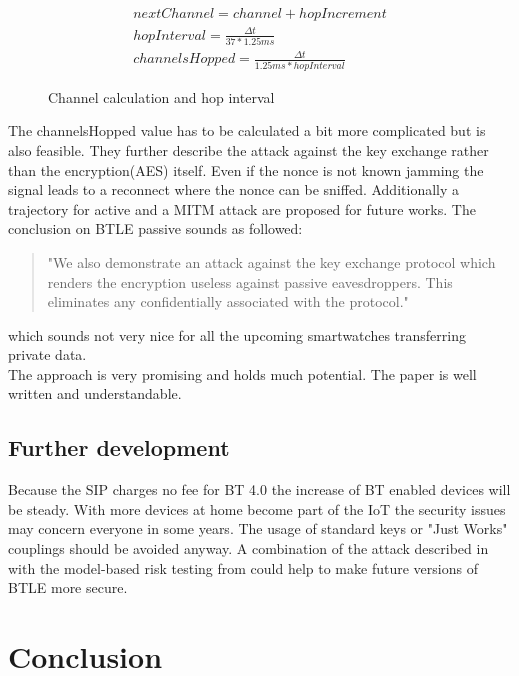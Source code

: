 \documentclass[12pt,a4paper]{article}
\begin{document}
\begin{figure}[h]
\begin{center}
	\begin{align*}
		nextChannel = channel + hopIncrement\\
 		hopInterval = \frac{\Delta t}{37 * 1.25ms} \\
 		channelsHopped = \frac{\Delta t}{1.25ms * hopInterval}
	\end{align*}
\caption{Channel calculation and hop interval \cite{DBLP:conf/woot/Ryan13}}
\label{le_bt_formulas}
\end{center}
\end{figure}
 The channelsHopped value has to be calculated a bit more complicated but is also feasible. They further describe the attack against the key exchange rather than the encryption(AES) itself. Even if the nonce is not known jamming the signal leads to a reconnect where the nonce can be sniffed. Additionally a trajectory for active and a MITM attack are proposed for future works.
The conclusion on BTLE passive sounds as followed:
\begin{quote}
	"We also demonstrate an attack against the key exchange protocol which renders the encryption useless against passive eavesdroppers. This eliminates any confidentially associated with the protocol."\cite{DBLP:conf/woot/Ryan13}
\end{quote}
which sounds not very nice for all the upcoming smartwatches transferring private data.\\
The approach is very promising and holds much potential. The paper is well written and understandable.

\subsection{Further development}
Because the SIP charges no fee for BT 4.0 the increase of BT enabled devices will be steady. With more devices at home become part of the IoT the security issues may concern everyone in some years. The usage of standard keys or "Just Works" couplings should be avoided anyway. A combination of the attack described in \cite{DBLP:conf/woot/Ryan13} with the model-based risk testing from \cite{DBLP:conf/automotiveSS/JakobKSGMSF12} could help to make future versions of BTLE more secure.

\section{Conclusion}
\end{document}
